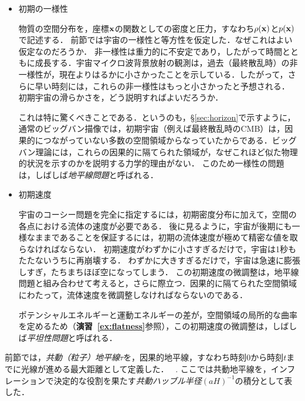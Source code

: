 \begin{itemize}
\item 初期の一様性

物質の空間分布を，座標${\bf x}$の関数としての密度と圧力，すなわち$\rho({\bf x})$と$p({\bf x})$で記述する．
前節では宇宙の一様性と等方性を仮定した．なぜこれはよい仮定なのだろうか．%
非一様性は重力的に不安定であり，したがって時間とともに成長する．宇宙マイクロ波背景放射の観測は，過去（最終散乱時）の非一様性が，現在よりはるかに小さかったことを示している．したがって，さらに早い時刻には，これらの非一様性はもっと小さかったと予想される．
初期宇宙の滑らかさを，どう説明すればよいだろうか．

これは特に驚くべきことである．というのも，\S\ref{sec:horizon}で示すように，通常のビッグバン描像では，初期宇宙（例えば最終散乱時のCMB）は，因果的につながっていない多数の空間領域からなっていたからである．ビッグバン理論には，これらの因果的に隔てられた領域が，なぜこれほど似た物理的状況を示すのかを説明する力学的理由がない．
このため一様性の問題は，しばしば{\it 地平線問題}と呼ばれる．

\item 初期速度

宇宙のコーシー問題を完全に指定するには，初期密度分布に加えて，空間の各点における流体の速度が必要である．
後に見るように，宇宙が後期にも一様なままであることを保証するには，初期の流体速度が極めて精密な値を取らなければならない．
初期速度がわずかに小さすぎるだけで，宇宙は1秒もたたないうちに再崩壊する．
わずかに大きすぎるだけで，宇宙は急速に膨張しすぎ，たちまちほぼ空になってしまう．
この初期速度の微調整は，地平線問題と組み合わせて考えると，さらに際立つ．因果的に隔てられた空間領域にわたって，流体速度を微調整しなければならないのである．

ポテンシャルエネルギーと運動エネルギーの差が，空間領域の局所的な曲率を定めるため（{\bf 演習~\ref{ex:flatness}}参照），この初期速度の微調整は，しばしば{\it 平坦性問題}と呼ばれる．

\end{itemize}

\label{sec:horizon}

前節では，{\it 共動（粒子）地平線}$\tau$を，因果的地平線，すなわち時刻$0$から時刻$t$までに光線が進める最大距離として定義した．
\beq
{}\, .
\eeq
ここでは共動地平線を，インフレーションで決定的な役割を果たす{\it 共動ハッブル半径}$(aH)^{-1}$の積分として表した．

